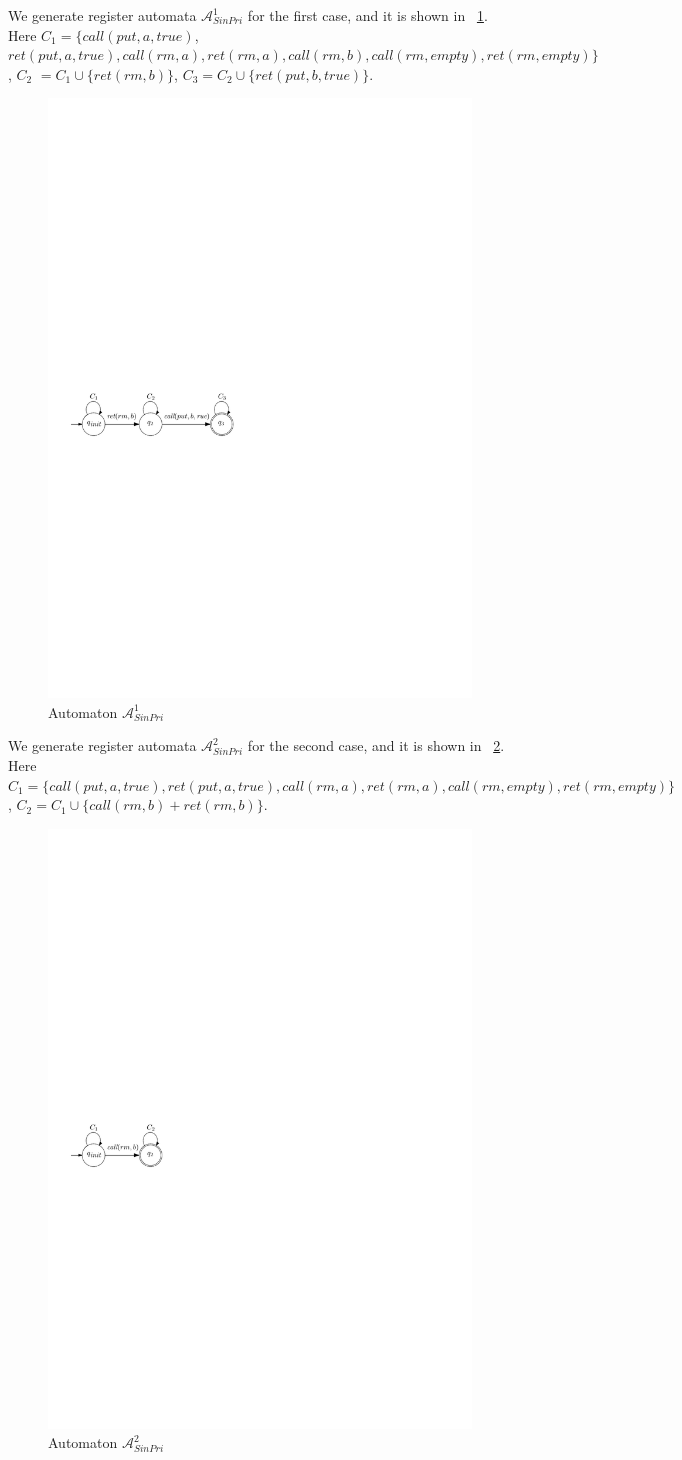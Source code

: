 We generate register automata $\mathcal{A}_{\textit{SinPri}}^1$ for the first case, and it is shown in \figurename~\ref{fig:automata for FIFO-1 in appendix}. Here $C_1 = \{ \textit{call}(\textit{put},a,\textit{true})$, $\textit{ret}(\textit{put},a,\textit{true}), \textit{call}(\textit{rm},a),\textit{ret}(\textit{rm},a),\textit{call}(\textit{rm},b),\textit{call}(\textit{rm},\textit{empty}),\textit{ret}(\textit{rm},\textit{empty}) \}$, $C_2$ $= C_1 \cup \{ \textit{ret}(\textit{rm},b) \}$, $C_3 = C_2 \cup \{ \textit{ret}(\textit{put},b,\textit{true}) \}$.


\begin{figure}[htbp]
  \centering
  \includegraphics[width=0.5 \textwidth]{figures/PIC_AUTO_FIFO_1.pdf}
  \caption{Automaton $\mathcal{A}_{\textit{SinPri}}^1$}
  \label{fig:automata for FIFO-1 in appendix}
\end{figure}


We generate register automata $\mathcal{A}_{\textit{SinPri}}^2$ for the second case, and it is shown in \figurename~\ref{fig:automata for FIFO-2}. Here $C_1 = \{ \textit{call}(\textit{put},a,\textit{true}),\textit{ret}(\textit{put},a,\textit{true}), \textit{call}(\textit{rm},a),\textit{ret}(\textit{rm},a),\textit{call}(\textit{rm},\textit{empty}),\textit{ret}(\textit{rm},\textit{empty}) \}$, $C_2 = C_1 \cup \{ \textit{call}(\textit{rm},b) + \textit{ret}(\textit{rm},b) \}$.


\begin{figure}[htbp]
  \centering
  \includegraphics[width=0.3 \textwidth]{figures/PIC_AUTO_FIFO_2.pdf}
  \caption{Automaton $\mathcal{A}_{\textit{SinPri}}^2$}
  \label{fig:automata for FIFO-2}
\end{figure}

